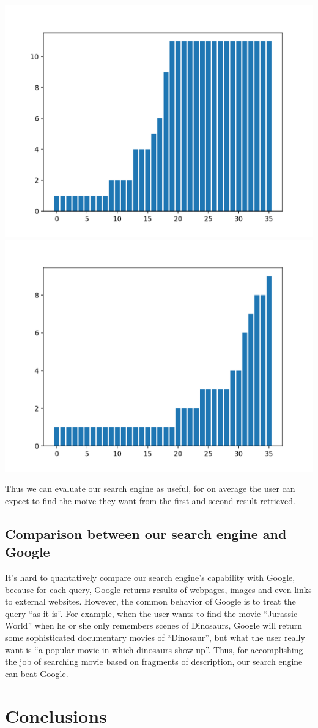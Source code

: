 \documentclass[letterpaper,10pt]{article}
\newenvironment{Figure}
  {\par\medskip\noindent\minipage{\linewidth}}
  {\endminipage\par\medskip}
\begin{document}
\begin{multicols}{2}
    \begin{Figure}
        \center
        \includegraphics[width=0.47\linewidth]{evaluation_1.png}
        \includegraphics[width=0.47\linewidth]{evaluation_2.png}
    \end{Figure}

    Thus we can evaluate our search engine as useful, for on average the user
    can expect to find the moive they want from the first and second result
    retrieved.

    \subsection{Comparison between our search engine and Google}

    It's hard to quantatively compare our search engine's capability with
    Google, because for each query, Google returns results of webpages, images
    and even links to external websites.
    However, the common behavior of Google is to treat the query ``as it is''. 
    For example, when the user wants to find the movie ``Jurassic World'' when he or she only remembers
    scenes of Dinosaurs, Google will return some sophisticated documentary
    movies of ``Dinosaur'', but what the user really want is ``a popular movie in
    which dinosaurs show up''. 
    Thus, for accomplishing the job of searching movie based on fragments of description, our search engine
    can beat Google.

    \section{Conclusions}


\end{multicols}
\end{document}
